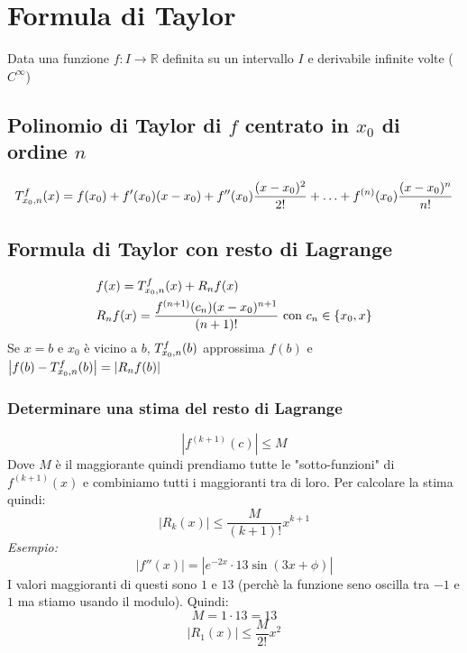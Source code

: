 \documentclass[10pt, a4paper]{article}
\begin{document}
\section{Formula di Taylor}
    Data una funzione $f:I\rightarrow\mathbb{R}$ definita su un intervallo $I$ e derivabile infinite volte ($C^{\infty}$)
    \subsection{Polinomio di Taylor di $f$ centrato in $x_0$ di ordine $n$}
        \begin{equation*}
            \taylor{f}{x_0}{n}(x) = f(x_0)+f'(x_0)(x-x_0)+f''(x_0)\frac{(x-x_0)^2}{2!}+\ldots+f^{(n)}(x_0)\frac{(x-x_0)^n}{n!}
        \end{equation*}
    \subsection{Formula di Taylor con resto di Lagrange}
        \begin{equation*}
            \begin{split}
                &f(x) = \taylor{f}{x_0}{n}(x) + R_nf(x)\\
                &R_nf(x) = \frac{f^{(n+1)}(c_n)(x-x_0)^{n+1}}{(n+1)!} \text{ con } c_n\in\{x_0,x\}
            \end{split}
        \end{equation*}
        Se $x=b$ e $x_0$ è vicino a $b$, $\taylor{f}{x_0}{n}(b)$ approssima $f(b)$ e $\left|f(b)-\taylor{f}{x_0}{n}(b)\right| = \left|R_nf(b)\right|$
        \subsubsection{Determinare una stima del resto di Lagrange}
            \begin{equation*}
                \left|f^{(k+1)}(c)\right|\leq M
            \end{equation*}
            Dove $M$ è il maggiorante quindi prendiamo tutte le "sotto-funzioni" di $f^{(k+1)}(x)$ e combiniamo tutti i maggioranti tra di loro. Per calcolare la stima quindi:
            \begin{equation*}
                \left|R_k(x)\right|\leq \frac{M}{(k+1)!}x^{k+1}
            \end{equation*}
            \textit{Esempio:}
            \begin{equation*}
                \left|f''(x)\right|=\left|e^{-2x}\cdot 13\sin(3x+\phi)\right|
            \end{equation*}
            I valori maggioranti di questi sono $1$ e $13$ (perchè la funzione seno oscilla tra $-1$ e $1$ ma stiamo usando il modulo). Quindi:
            \begin{equation*}
                M = 1\cdot 13 = 13
            \end{equation*}
            \begin{equation*}
                \left|R_1(x)\right|\leq \frac{M}{2!}x^2
            \end{equation*}
\end{document}

